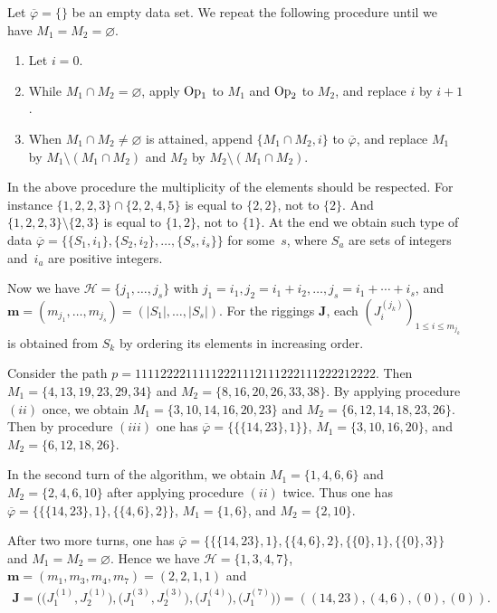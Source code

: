 \documentclass[pdftex]{sigma}
\newcommand{\m}{{\boldsymbol m}}
\newcommand{\boJ}{{\boldsymbol J}}
\begin{document}
Let $\overline{\varphi} = \{ \}$ be an empty data set.
We repeat the following procedure until we have $M_1 = M_2 = \varnothing$.
\begin{enumerate}\itemsep=0pt
\item Let $i=0$.
\item While $M_1 \cap M_2 = \varnothing$, apply ${\rm Op}_1$ to $M_1$ and ${\rm Op}_2$ to $M_2$, and
replace $i$ by $i+1$.
\item When $M_1 \cap M_2 \ne \varnothing$ is attained, append $\{ M_1 \cap M_2 , i\}$ to $\overline{\varphi}$,
and replace $M_1$ by $M_1 \setminus (M_1 \cap M_2)$ and $M_2$ by $M_2 \setminus (M_1 \cap M_2)$.
\end{enumerate}
In the above procedure the multiplicity of the
elements should be respected.
For instance $\{1,2,2,3\} \cap \{2,2,4,5\}$ is
equal to $\{2,2\}$, not to $\{2\}$.
And $\{1,2,2,3\} \setminus \{2,3\}$ is
equal to $\{1,2\}$, not to $\{1\}$.
%
At the end we obtain such type of data
$\overline{\varphi}=\{ \{S_1,i_1\}, \{S_2,i_2\},\ldots,\{S_s,i_s\} \}$
for some~$s$, where $S_a$ are sets of integers and~$i_a$ are positive integers.

Now we have ${\mathcal H} = \{ j_1, \ldots, j_s \}$
with $j_1=i_1, j_2=i_1+i_2, \ldots, j_s = i_1 + \cdots + i_s$,
and $\m = (m_{j_1}, \ldots, m_{j_s}) = (|S_1|, \ldots, |S_s|)$.
For the riggings $\boJ$, each $(J^{(j_k)}_i)_{1 \le i \le m_{j_k}}$ is obtained from $S_k$ by
ordering its elements in increasing order.

\begin{example}
Consider the path $p=11112222111112221112111222111222212222$.
Then $M_1 = \{ 4,13,19,23,29, 34 \}$ and $M_2 = \{ 8, 16, 20, 26, 33, 38 \}$.
By applying procedure $(ii)$ once,
we obtain
$M_1 = \{ 3,10,14,16,20, 23 \}$ and $M_2 = \{ 6, 12, 14, 18, 23, 26 \}$.
Then by procedure $(iii)$ one has $\overline{\varphi}=\{ \{ \{ 14, 23 \},1\} \}$,
$M_1 = \{ 3,10,16,20 \}$, and $M_2 = \{ 6, 12, 18, 26 \}$.

In the second turn of the algorithm,
we obtain
$M_1 = \{ 1,4,6,6 \}$ and $M_2 = \{ 2,4,6,10 \}$ after applying procedure $(ii)$ twice.
Thus one has $\overline{\varphi}=\{ \{ \{ 14, 23 \},1\}, \{ \{ 4, 6 \},2\} \}$,
$M_1 = \{ 1,6 \}$, and $M_2 = \{ 2, 10 \}$.

After two more turns,
one has $\overline{\varphi}=\{ \{ \{ 14, 23 \},1\}, \{ \{ 4, 6 \},2\}, \{ \{ 0 \},1\}, \{ \{ 0 \},3\} \}$
and $M_1 =  M_2 = \varnothing$.
Hence we have ${\mathcal H} = \{ 1,3,4,7 \}$, $\m = (m_1,m_3,m_4,m_7)= (2,2,1,1)$ and
\begin{gather*}
\boJ  = \big(\big(J^{(1)}_1,J^{(1)}_2\big),\big(J^{(3)}_1,J^{(3)}_2\big),\big(J^{(4)}_1\big),\big(J^{(7)}_1\big)\big) = ((14,23),(4,6),(0),(0)).
\end{gather*}



\end{example}
\end{document}
